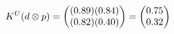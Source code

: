 \documentclass[preview]{standalone}
\begin{document}
\begin{align*}
\special{dvisvgm:raw <g id='unique000'>}K^U(d \otimes p) = \begin{pmatrix} (0.89)(0.84) \\ (0.82)(0.40) \end{pmatrix} = \begin{pmatrix} 0.75 \\ 0.32 \end{pmatrix}\special{dvisvgm:raw </g>}
\end{align*}
\end{document}
